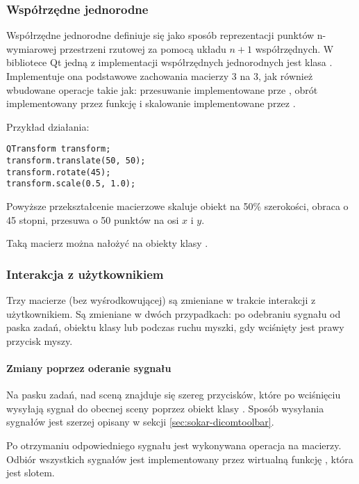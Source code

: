 \label{sec:algorithm-pixmap-transformat}

\subsubsection{Współrzędne jednorodne}

Współrzędne jednorodne definiuje się jako sposób reprezentacji punktów n-wymiarowej przestrzeni rzutowej za pomocą układu $n+1$ współrzędnych.
W bibliotece Qt jedną z implementacji współrzędnych jednorodnych jest klasa .
Implementuje ona podstawowe zachowania macierzy 3 na 3, jak również wbudowane operacje takie jak: przesuwanie implementowane prze , obrót implementowany przez funkcję  i skalowanie implementowane przez .

Przykład działania:
\begin{lstlisting}
QTransform transform;
transform.translate(50, 50);
transform.rotate(45);
transform.scale(0.5, 1.0);
\end{lstlisting}
Powyższe przekształcenie macierzowe skaluje obiekt na 50\% szerokości, obraca o 45 stopni, przesuwa o 50 punktów na osi $x$ i $y$.

\par
Taką macierz można nałożyć na obiekty klasy .

\subsubsection{Interakcja z użytkownikiem}

Trzy macierze (bez wyśrodkowującej) są zmieniane w trakcie interakcji z użytkownikiem.
Są zmieniane w dwóch przypadkach: po odebraniu sygnału od paska zadań, obiektu klasy  lub podczas ruchu myszki, gdy wciśnięty jest prawy przycisk myszy.

\paragraph{Zmiany poprzez oderanie sygnału}

\par
Na pasku zadań, nad sceną znajduje się szereg przycisków, które po wciśnięciu wysyłają sygnał do obecnej sceny poprzez obiekt klasy .
Sposób wysyłania sygnałów jest szerzej opisany w sekcji \ref{sec:sokar-dicomtoolbar}.

\par
Po otrzymaniu odpowiedniego sygnału jest wykonywana operacja na macierzy.
Odbiór wszystkich sygnałów jest implementowany przez wirtualną funkcję , która jest slotem.

